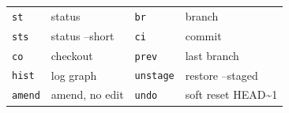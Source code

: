 \documentclass[10pt]{extarticle}
\begin{document}

\begin{tabularx}{\linewidth}{@{}l@{~}l@{\quad}l@{~}Y@{}}
\texttt{st}      & status         & \texttt{br}      & branch \\
\texttt{sts}     & status --short & \texttt{ci}      & commit \\
\texttt{co}      & checkout       & \texttt{prev}    & last branch \\
\texttt{hist}    & log graph      & \texttt{unstage} & restore --staged \\
\texttt{amend}   & amend, no edit & \texttt{undo}    & soft reset HEAD\~{}1 \\
\end{tabularx}\par
\end{document}
